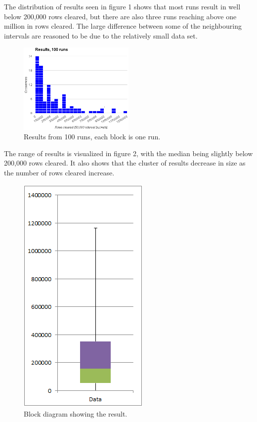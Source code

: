 \documentclass[twocolumn,12pt,journal,final]{IEEEtran_modified}
\begin{document}
The distribution of results seen in figure 1 shows that most runs result in well below 200,000 rows cleared, but there are also three runs reaching above one million in rows cleared. The large difference between some of the neighbouring intervals are reasoned to be due to the relatively small data set.

\begin{figure}[H]
  \centering
    \includegraphics[width=0.5\textwidth]{bucketresults.png}
  \caption{Results from 100 runs, each block is one run.}
  \label{fig:bucketresults}
\end{figure}

The range of results is visualized in figure 2, with the median being slightly below 200,000 rows cleared. It also shows that the cluster of results decrease in size as the number of rows cleared increase. 

\begin{figure}[h]
  \centering
    \includegraphics[scale=0.5]{blockresults.png}
  \caption{Block diagram showing the result.}
  \label{fig:blockresults}
\end{figure}
\end{document}
